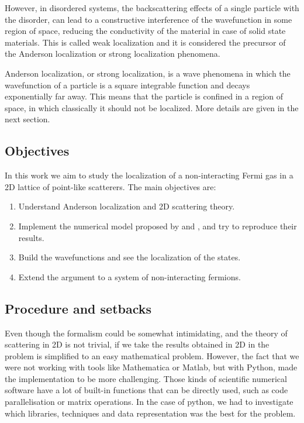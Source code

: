 However, in disordered systems, the backscattering effects of a single particle with the disorder, can lead to a constructive interference of the wavefunction in some region of space, reducing the conductivity of the material in case of solid state materials. This is called weak localization and it is considered the precursor of the Anderson localization or strong localization phenomena. 

Anderson localization, or strong localization, is a wave phenomena in which the wavefunction of a particle is a square integrable function and decays exponentially far away. This means that the particle is confined in a region of space, in which classically it should not be localized. More details are given in the next section.

\subsection{Objectives}

In this work we aim to study the localization of a non-interacting Fermi gas in a 2D lattice of point-like scatterers. The main objectives are:

\begin{enumerate}
    \item Understand Anderson localization and 2D scattering theory.
    \item Implement the numerical model proposed by \cite{massignanThreedimensional2006} and \cite{antezzaQuantitativeStudyTwo2010}, and try to reproduce their results.
    \item Build the wavefunctions and see the localization of the states.
    \item Extend the argument to a system of non-interacting fermions.
\end{enumerate}

\subsection{Procedure and setbacks}

Even though the formalism could be somewhat intimidating, and the theory of scattering in 2D is not trivial, if we take the results obtained in 2D in \cite{antezzaQuantitativeStudyTwo2010} the problem is simplified to an easy mathematical problem. However, the fact that we were not working with tools like Mathematica or Matlab, but with Python, made the implementation to be more challenging. Those kinds of scientific numerical software have a lot of built-in functions that can be directly used, such as code parallelisation or matrix operations. In the case of python, we had to investigate which libraries, techniques and data representation was the best for the problem. 

